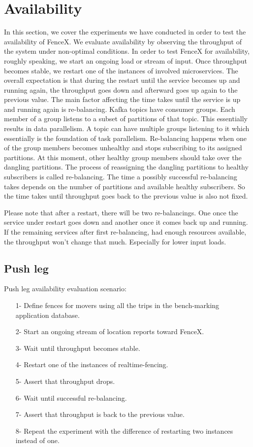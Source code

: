 \documentclass[a4]{report}
\begin{document}
    \section{Availability}
    In this section, we cover the experiments we have conducted in order to test the availability of FenceX.
    We evaluate availability by observing the throughput of the system under non-optimal conditions.
    In order to test FenceX for availability, roughly speaking, we start an ongoing load or stream of input.
    Once throughput becomes stable, we restart one of the instances of involved microservices.
    The overall expectation is that during the restart until the service becomes up and running again, the throughput goes down and afterward goes up again to the previous value.
    The main factor affecting the time takes until the service is up and running again is re-balancing.
    Kafka topics have consumer groups.
    Each member of a group listens to a subset of partitions of that topic.
    This essentially results in data parallelism.
    A topic can have multiple groups listening to it which essentially is the foundation of task parallelism.
    Re-balancing happens when one of the group members becomes unhealthy and stops subscribing to its assigned partitions.
    At this moment, other healthy group members should take over the dangling partitions.
    The process of reassigning the dangling partitions to healthy subscribers is called re-balancing.
    The time a possibly successful re-balancing takes depends on the number of partitions and available healthy subscribers.
    So the time takes until throughput goes back to the previous value is also not fixed.

    Please note that after a restart, there will be two re-balancings.
    One once the service under restart goes down and another once it comes back up and running.
    If the remaining services after first re-balancing, had enough resources available, the throughput won't change that much.
    Especially for lower input loads.

    \subsection{Push leg}
    Push leg availability evaluation scenario:
    \begin{itemize}
        \item[1-] Define fences for movers using all the trips in the bench-marking application database.
        \item[2-] Start an ongoing stream of location reports toward FenceX.
        \item[3-] Wait until throughput becomes stable.
        \item[4-] Restart one of the instances of realtime-fencing.
        \item[5-] Assert that throughput drops.
        \item[6-] Wait until successful re-balancing.
        \item[7-] Assert that throughput is back to the previous value.
        \item[8-] Repeat the experiment with the difference of restarting two instances instead of one.
    \end{itemize}
\end{document}
